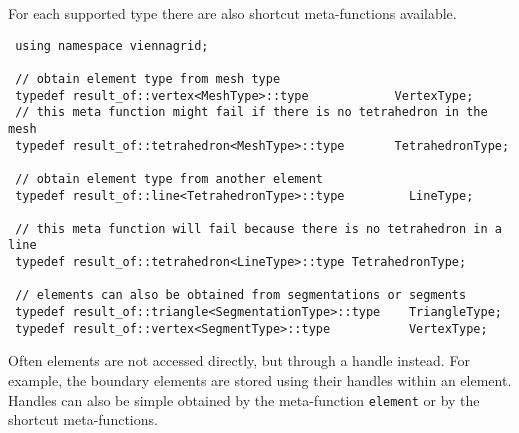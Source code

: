 For each supported type there are also shortcut meta-functions available.

\begin{lstlisting}
 using namespace viennagrid;

 // obtain element type from mesh type
 typedef result_of::vertex<MeshType>::type            VertexType;
 // this meta function might fail if there is no tetrahedron in the mesh
 typedef result_of::tetrahedron<MeshType>::type       TetrahedronType;

 // obtain element type from another element
 typedef result_of::line<TetrahedronType>::type         LineType;

 // this meta function will fail because there is no tetrahedron in a line
 typedef result_of::tetrahedron<LineType>::type TetrahedronType;

 // elements can also be obtained from segmentations or segments
 typedef result_of::triangle<SegmentationType>::type    TriangleType;
 typedef result_of::vertex<SegmentType>::type           VertexType;
\end{lstlisting}

\pagebreak

Often elements are not accessed directly, but through a handle instead.
For example, the boundary elements are stored using their handles within an element.
Handles can also be simple obtained by the meta-function \lstinline|element| or by the shortcut meta-functions.

